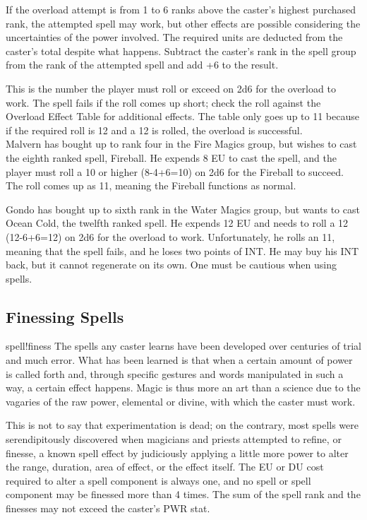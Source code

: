 If the overload attempt is from 1 to 6 ranks above the caster's highest purchased rank, the attempted spell may work, but other effects are possible considering the uncertainties of the power involved. The required units are deducted from the caster's total despite what happens. Subtract the caster's rank in the spell group from the rank of the attempted spell and add +6 to the result. 

This is the number the player must roll or exceed on 2d6 for the overload to work. The spell fails if the roll comes up short; check the roll against the Overload Effect Table for additional effects. The table only goes up to 11 because if the required roll is 12 and a 12 is rolled, the overload is successful.\\


Malvern has bought up to rank four in the Fire Magics group, but wishes to cast the eighth ranked spell, Fireball. He expends 8 EU to cast the spell, and the player must roll a 10 or higher (8-4+6=10) on 2d6 for the Fireball to succeed. The roll comes up as 11, meaning the Fireball functions as normal.

Gondo has bought up to sixth rank in the Water Magics group, but wants to cast Ocean Cold, the twelfth ranked spell. He expends 12 EU and needs to roll a 12 (12-6+6=12) on 2d6 for the overload to work. Unfortunately, he rolls an 11, meaning that the spell fails, and he loses two points of INT. He may buy his INT back, but it cannot regenerate on its own. One must be cautious when using spells.
\subsection{Finessing Spells}
spell!finess
The spells any caster learns have been developed over centuries of trial and much error. What has been learned is that when a certain amount of power is called forth and, through specific gestures and words manipulated in such a way, a certain effect happens. Magic is thus more an art than a science due to the vagaries of the raw power, elemental or divine, with which the caster must work.

This is not to say that experimentation is dead; on the contrary, most spells were serendipitously discovered when magicians and priests attempted to refine, or finesse, a known spell effect by judiciously applying a little more power to alter the range, duration, area of effect, or the effect itself. The EU or DU cost required to alter a spell component is always one, and no spell or spell component may be finessed more than 4 times. The sum of the spell rank and the finesses may not exceed the caster's PWR stat.

